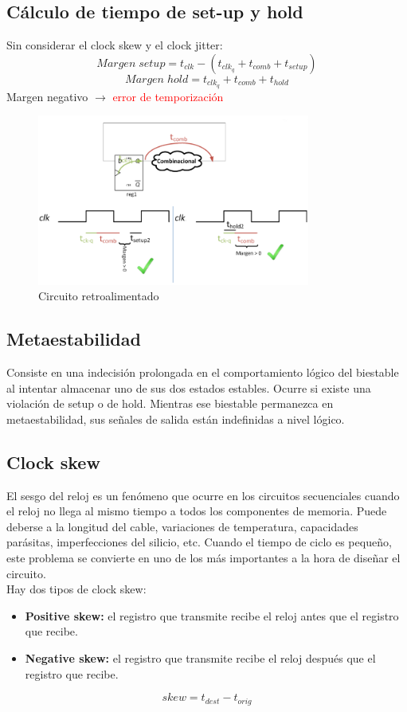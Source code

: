 \subsection{Cálculo de tiempo de set-up y hold}
Sin considerar el clock skew y el clock jitter:
\[
    Margen\; setup = t_{clk}- \left(t_{clk_q} +t_{comb} + t_{setup}\right)
\]
\[
    Margen \; hold = t_{clk_q} + t_{comb} + t_{hold}
\]
Margen negativo $\rightarrow$ \textcolor{red}{error de temporización}
\begin{figure}[H]
    \centering
    \includegraphics[width=0.8\textwidth]{images/Tema_2/Circ_retroalimentado.PNG}
    \caption{Circuito retroalimentado}
\end{figure}

\subsection{Metaestabilidad}
Consiste en una indecisión prolongada en el comportamiento lógico del  biestable al intentar almacenar uno de sus dos estados estables.
Ocurre si existe una violación de setup o de hold. Mientras ese biestable permanezca en metaestabilidad, sus señales de salida están indefinidas a nivel lógico.
\subsection{Clock skew}
El sesgo del reloj es un fenómeno que ocurre en los circuitos secuenciales cuando el reloj no llega al mismo tiempo a todos los componentes de memoria. Puede deberse a la longitud del cable, variaciones de temperatura, capacidades parásitas, imperfecciones del silicio, etc.
Cuando el tiempo de ciclo es pequeño, este problema se convierte en uno de los más importantes a la hora de diseñar el circuito.\\
Hay dos tipos de clock skew:
\begin{itemize}
    \item\textbf{Positive skew:} el registro que transmite recibe el reloj antes que el registro que recibe.
    \item\textbf{Negative skew:} el registro que transmite recibe el reloj después que el registro que recibe.
\end{itemize}
\[
    skew=t_{dest}-t_{orig}
\]

